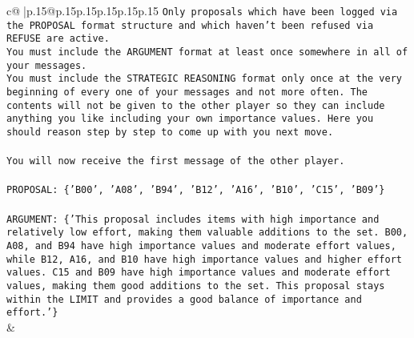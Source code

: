 \documentclass{article}
\begin{document}
{\begin{supertabular}{c@{$\;$}|p{.15\linewidth}@{}p{.15\linewidth}p{.15\linewidth}p{.15\linewidth}p{.15\linewidth}p{.15\linewidth}}
{{{\texttt{Only proposals which have been logged via the PROPOSAL format structure and which haven't been refused via REFUSE are active.} \\
\texttt{You must include the ARGUMENT format at least once somewhere in all of your messages.} \\
\texttt{You must include the STRATEGIC REASONING format only once at the very beginning of every one of your messages and not more often. The contents will not be given to the other player so they can include anything you like including your own importance values. Here you should reason step by step to come up with you next move.} \\
\\ 
\texttt{You will now receive the first message of the other player.} \\
\\ 
\texttt{PROPOSAL: \{'B00', 'A08', 'B94', 'B12', 'A16', 'B10', 'C15', 'B09'\} } \\
\\ 
\texttt{ARGUMENT: \{'This proposal includes items with high importance and relatively low effort, making them valuable additions to the set. B00, A08, and B94 have high importance values and moderate effort values, while B12, A16, and B10 have high importance values and higher effort values. C15 and B09 have high importance values and moderate effort values, making them good additions to the set. This proposal stays within the LIMIT and provides a good balance of importance and effort.'\}} \\
            }
        }
    }
    & \\ \\


\end{supertabular}}
\end{document}
